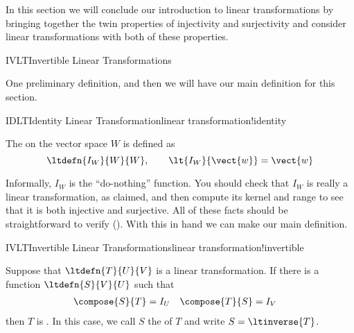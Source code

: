 %
\begin{introduction}
\begin{para}In this section we will conclude our introduction to linear transformations by bringing together the twin properties of injectivity and surjectivity and consider linear transformations with both of these properties.\end{para}
\end{introduction}
%
\begin{subsect}{IVLT}{Invertible Linear Transformations}
%
\begin{para}One preliminary definition, and then we will have our main definition for this section.\end{para}
%
\begin{definition}{IDLT}{Identity Linear Transformation}{linear transformation!identity}
\begin{para}The  on the vector space $W$ is defined as
%
\begin{equation*}
\ltdefn{I_W}{W}{W},\quad\quad \lt{I_W}{\vect{w}}=\vect{w}
\end{equation*}
\end{para}
%
\end{definition}
%
\begin{para}Informally, $I_W$ is the ``do-nothing'' function.  You should check that $I_W$ is really a linear transformation, as claimed, and then compute its kernel and range to see that it is both injective and surjective.  All of these facts should be straightforward to verify ().  With this in hand we can make our main definition.\end{para}
%
%
\begin{definition}{IVLT}{Invertible Linear Transformations}{linear transformation!invertible}
\begin{para}Suppose that $\ltdefn{T}{U}{V}$ is a linear transformation.  If there is a function $\ltdefn{S}{V}{U}$ such that
%
\begin{align*}
\compose{S}{T}&=I_U & \compose{T}{S}&=I_V
\end{align*}
%
then $T$ is .  In this case, we call $S$ the  of $T$ and write $S=\ltinverse{T}$.\end{para}

\end{definition}
\end{subsect}
